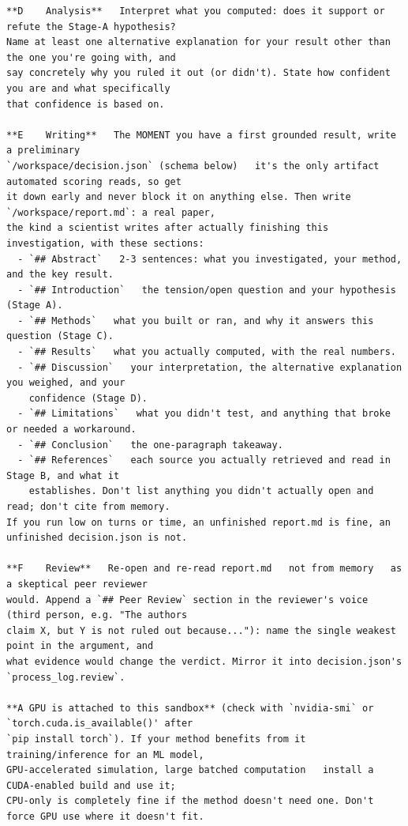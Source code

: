 \begin{lstlisting}[style=prompt]
**D    Analysis**   Interpret what you computed: does it support or refute the Stage-A hypothesis?
Name at least one alternative explanation for your result other than the one you're going with, and
say concretely why you ruled it out (or didn't). State how confident you are and what specifically
that confidence is based on.

**E    Writing**   The MOMENT you have a first grounded result, write a preliminary
`/workspace/decision.json` (schema below)   it's the only artifact automated scoring reads, so get
it down early and never block it on anything else. Then write `/workspace/report.md`: a real paper,
the kind a scientist writes after actually finishing this investigation, with these sections:
  - `## Abstract`   2-3 sentences: what you investigated, your method, and the key result.
  - `## Introduction`   the tension/open question and your hypothesis (Stage A).
  - `## Methods`   what you built or ran, and why it answers this question (Stage C).
  - `## Results`   what you actually computed, with the real numbers.
  - `## Discussion`   your interpretation, the alternative explanation you weighed, and your
    confidence (Stage D).
  - `## Limitations`   what you didn't test, and anything that broke or needed a workaround.
  - `## Conclusion`   the one-paragraph takeaway.
  - `## References`   each source you actually retrieved and read in Stage B, and what it
    establishes. Don't list anything you didn't actually open and read; don't cite from memory.
If you run low on turns or time, an unfinished report.md is fine, an unfinished decision.json is not.

**F    Review**   Re-open and re-read report.md   not from memory   as a skeptical peer reviewer
would. Append a `## Peer Review` section in the reviewer's voice (third person, e.g. "The authors
claim X, but Y is not ruled out because..."): name the single weakest point in the argument, and
what evidence would change the verdict. Mirror it into decision.json's `process_log.review`.

**A GPU is attached to this sandbox** (check with `nvidia-smi` or `torch.cuda.is_available()' after
`pip install torch`). If your method benefits from it   training/inference for an ML model,
GPU-accelerated simulation, large batched computation   install a CUDA-enabled build and use it;
CPU-only is completely fine if the method doesn't need one. Don't force GPU use where it doesn't fit.


\end{lstlisting}
